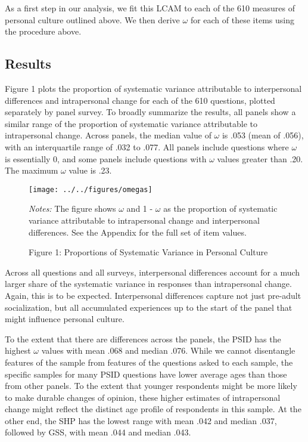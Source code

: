 \documentclass[
  11pt,
]{article}
\begin{document}
As a first step in our analysis, we fit this LCAM to each of the 610
measures of personal culture outlined above. We then derive \(\omega\)
for each of these items using the procedure above.

\subsection{Results}\label{results}

Figure 1 plots the proportion of systematic variance attributable to
interpersonal differences and intrapersonal change for each of the 610
questions, plotted separately by panel survey. To broadly summarize the
results, all panels show a similar range of the proportion of systematic
variance attributable to intrapersonal change. Across panels, the median
value of \(\omega\) is .053 (mean of .056), with an interquartile range
of .032 to .077. All panels include questions where \(\omega\) is
essentially 0, and some panels include questions with \(\omega\) values
greater than .20. The maximum \(\omega\) value is .23.

\begin{figure}[!p]
\begin{center}

\begin{center}\texttt{[image: ../../figures/omegas]} \end{center}

\end{center}
\caption*{Figure 1: Proportions of Systematic Variance in Personal Culture}
\footnotesize{\textit{Notes:} The figure shows $\omega$ and 1 - $\omega$ as the proportion of systematic variance attributable to intrapersonal change and interpersonal differences. See the Appendix for the full set of item values.}
\end{figure}

Across all questions and all surveys, interpersonal differences account
for a much larger share of the systematic variance in responses than
intrapersonal change. Again, this is to be expected. Interpersonal
differences capture not just pre-adult socialization, but all
accumulated experiences up to the start of the panel that might
influence personal culture.

To the extent that there are differences across the panels, the PSID has
the highest \(\omega\) values with mean .068 and median .076. While we
cannot disentangle features of the sample from features of the questions
asked to each sample, the specific samples for many PSID questions have
lower average ages than those from other panels. To the extent that
younger respondents might be more likely to make durable changes of
opinion, these higher estimates of intrapersonal change might reflect
the distinct age profile of respondents in this sample. At the other
end, the SHP has the lowest range with mean .042 and median .037,
followed by GSS, with mean .044 and median .043.
\end{document}
